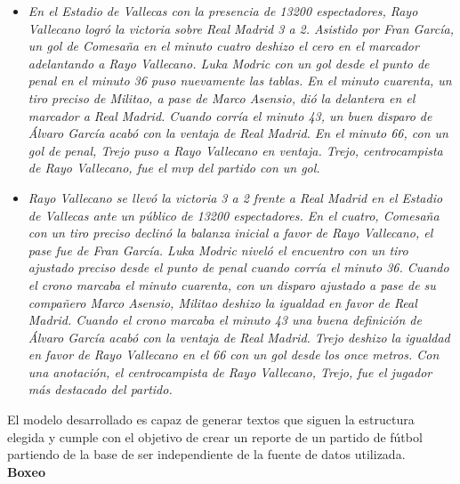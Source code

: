 \begin{itemize}
    \item \textit{En el Estadio de Vallecas con la presencia de 13200 espectadores, Rayo Vallecano logró la victoria sobre Real Madrid 3 a 2.
    Asistido por Fran García, un gol de Comesaña en el minuto cuatro deshizo el cero en el marcador adelantando a Rayo Vallecano. Luka Modric con un gol desde el punto de penal en el minuto 36 puso nuevamente las tablas. En el minuto cuarenta, un tiro preciso de Militao, a pase de Marco Asensio, dió la delantera en el marcador a Real Madrid. Cuando corría el minuto 43, un buen disparo de Álvaro García acabó con la ventaja de Real Madrid. En el minuto 66, con un gol de penal, Trejo puso a Rayo Vallecano en ventaja.
    Trejo, centrocampista de Rayo Vallecano, fue el mvp del partido con un gol.}
    \item \textit{Rayo Vallecano se llevó la victoria 3 a 2 frente a Real Madrid en el Estadio de Vallecas ante un público de 13200 espectadores.
    En el cuatro, Comesaña con un tiro preciso declinó la balanza inicial a favor de Rayo Vallecano, el pase fue de Fran García. Luka Modric niveló el encuentro con un tiro ajustado preciso desde el punto de penal cuando corría el minuto 36. Cuando el crono marcaba el minuto cuarenta, con un disparo ajustado a pase de su compañero Marco Asensio, Militao deshizo la igualdad en favor de Real Madrid. Cuando el crono marcaba el minuto 43 una buena definición de Álvaro García acabó con la ventaja de Real Madrid. Trejo deshizo la igualdad en favor de Rayo Vallecano en el 66 con un gol desde los once metros.
    Con una anotación, el centrocampista de Rayo Vallecano, Trejo, fue el jugador más destacado del partido.}
\end{itemize}

El modelo desarrollado es capaz de generar textos que siguen la estructura elegida y cumple con el objetivo de 
crear un reporte de un partido de fútbol partiendo de la base de ser independiente de la fuente de datos utilizada. 
\\

    \textbf{Boxeo}\\



